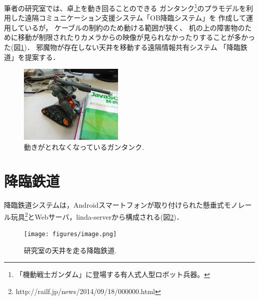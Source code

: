 \documentclass[submit,techreq]{ipsj}
\begin{document}
筆者の研究室では、卓上を動き回ることのできる
ガンタンク\footnote{
  「機動戦士ガンダム」に登場する有人式人型ロボット兵器。
}のプラモデルを利用した遠隔コミュニケーション支援システム「OB降臨システム」を
作成して運用しているが\cite{Hirota:Korin}，
ケーブルの制約のため動ける範囲が狭く、
机の上の障害物のために移動が制限されたりカメラからの映像が見られなかったりすることが多かった(図\ref{guntank})．
%
邪魔物が存在しない天井を移動する遠隔情報共有システム
「降臨鉄道」を提案する．

\begin{figure}[H]
\centerline{\includegraphics[width=50mm]{figures/1e8781bb2a5b28c8e06906d226c7505a.png}}
\caption{動きがとれなくなっているガンタンク.}
\label{guntank}
\end{figure}



% 
% 
% 

\section{降臨鉄道}

降臨鉄道システムは，Androidスマートフォンが取り付けられた懸垂式モノレール玩具\footnote{
  \textsf{http://railf.jp/news/2014/09/18/000000.html}
}とWebサーバ，linda-server\cite{Shokai:Linda}から構成される(図\ref{monorail})．

\begin{figure}[H]
\begin{center}
\texttt{[image: figures/image.png]}
\end{center}
\caption{研究室の天井を走る降臨鉄道.}
\label{monorail}
\end{figure}
\end{document}

